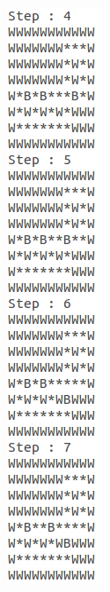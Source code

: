 \documentclass[10pt, letter]{article}
\begin{document}
\begin{figure} [h!]
\begin{subfigure}{.5\textwidth}
  \includegraphics[scale = 0.35]{images/sokoban3-ans2}
\end{subfigure}\\
\begin{subfigure}{.3\textwidth}
  \centering

\end{subfigure}
\end{figure}
\end{document}
